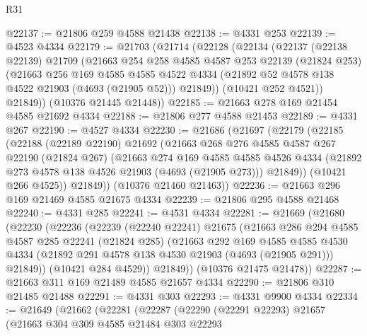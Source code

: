 \begin{lexlean}{R31}
\begin{coremodule}
@22137 := @21806 @259 @4588 @21438
@22138 := @4331 @253
@22139 := @4523 @4334
@22179 := @21703
    (@21714
      (@22128
        (@22134
          (@22137
            (@22138 @22139)
            @21709
            (@21663
              @254
              @258
              @4585
              @4587
              @253
              @22139
              (@21824 @253)
              (@21663
                @256
                @169
                @4585
                @4585
                @4522
                @4334
                (@21892 @52 @4578 @138 @4522 @21903 (@4693 (@21905 @52)))
                @21849))
            (@10421 @252 @4521))
          @21849))
      (@10376 @21445 @21448))
@22185 := @21663 @278 @169 @21454 @4585 @21692 @4334
@22188 := @21806 @277 @4588 @21453
@22189 := @4331 @267
@22190 := @4527 @4334
@22230 := @21686
    (@21697
      (@22179
        (@22185
          (@22188
            (@22189 @22190)
            @21692
            (@21663
              @268
              @276
              @4585
              @4587
              @267
              @22190
              (@21824 @267)
              (@21663
                @274
                @169
                @4585
                @4585
                @4526
                @4334
                (@21892 @273 @4578 @138 @4526 @21903 (@4693 (@21905 @273)))
                @21849))
            (@10421 @266 @4525))
          @21849))
      (@10376 @21460 @21463))
@22236 := @21663 @296 @169 @21469 @4585 @21675 @4334
@22239 := @21806 @295 @4588 @21468
@22240 := @4331 @285
@22241 := @4531 @4334
@22281 := @21669
    (@21680
      (@22230
        (@22236
          (@22239
            (@22240 @22241)
            @21675
            (@21663
              @286
              @294
              @4585
              @4587
              @285
              @22241
              (@21824 @285)
              (@21663
                @292
                @169
                @4585
                @4585
                @4530
                @4334
                (@21892 @291 @4578 @138 @4530 @21903 (@4693 (@21905 @291)))
                @21849))
            (@10421 @284 @4529))
          @21849))
      (@10376 @21475 @21478))
@22287 := @21663 @311 @169 @21489 @4585 @21657 @4334
@22290 := @21806 @310 @21485 @21488
@22291 := @4331 @303
@22293 := @4331 @9900 @4334
@22334 := @21649
    (@21662
      (@22281
        (@22287
          (@22290
            (@22291 @22293)
            @21657
            (@21663
              @304
              @309
              @4585
              @21484
              @303
              @22293

\end{coremodule}
\end{lexlean}
